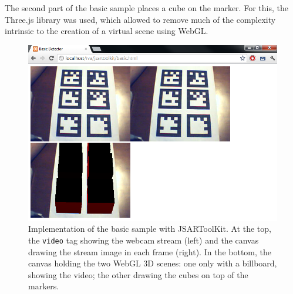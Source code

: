 The second part of the basic sample places a cube on the marker. For this, the Three.js library was used, which allowed to remove much of the complexity intrinsic to the creation of a virtual scene using WebGL.

\begin{figure}[p]
	\begin{center}
		\includegraphics[width=\columnwidth]{report/images/basic.png}
	\end{center}
	\caption[Basic Sample]{Implementation of the basic sample with JSARToolKit. At the top, the \texttt{video} tag showing the webcam stream (left) and the canvas drawing the stream image in each frame (right). In the bottom, the canvas holding the two WebGL 3D scenes: one only with a billboard, showing the video; the other drawing the cubes on top of the markers.}
	\label{fig:basic}
\end{figure}